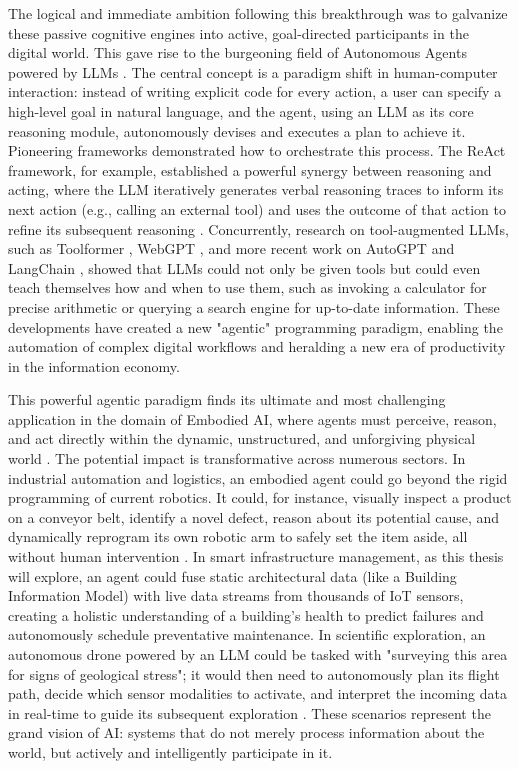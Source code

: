 The logical and immediate ambition following this breakthrough was to galvanize these passive cognitive engines into active, goal-directed participants in the digital world. This gave rise to the burgeoning field of Autonomous Agents powered by LLMs \cite{xi2023rise}. The central concept is a paradigm shift in human-computer interaction: instead of writing explicit code for every action, a user can specify a high-level goal in natural language, and the agent, using an LLM as its core reasoning module, autonomously devises and executes a plan to achieve it. Pioneering frameworks demonstrated how to orchestrate this process. The ReAct framework, for example, established a powerful synergy between reasoning and acting, where the LLM iteratively generates verbal reasoning traces to inform its next action (e.g., calling an external tool) and uses the outcome of that action to refine its subsequent reasoning \cite{yao2022react}. Concurrently, research on tool-augmented LLMs, such as Toolformer \cite{schick2023toolformer}, WebGPT \cite{nakano2021webgpt}, and more recent work on AutoGPT \cite{richards2023autogpt} and LangChain \cite{chase2022langchain}, showed that LLMs could not only be given tools but could even teach themselves how and when to use them, such as invoking a calculator for precise arithmetic or querying a search engine for up-to-date information. These developments have created a new "agentic" programming paradigm, enabling the automation of complex digital workflows and heralding a new era of productivity in the information economy.

This powerful agentic paradigm finds its ultimate and most challenging application in the domain of Embodied AI, where agents must perceive, reason, and act directly within the dynamic, unstructured, and unforgiving physical world \cite{duan2022survey}. The potential impact is transformative across numerous sectors. In industrial automation and logistics, an embodied agent could go beyond the rigid programming of current robotics. It could, for instance, visually inspect a product on a conveyor belt, identify a novel defect, reason about its potential cause, and dynamically reprogram its own robotic arm to safely set the item aside, all without human intervention \cite{ahn2022can, brohan2023rt2}. In smart infrastructure management, as this thesis will explore, an agent could fuse static architectural data (like a Building Information Model) with live data streams from thousands of IoT sensors, creating a holistic understanding of a building's health to predict failures and autonomously schedule preventative maintenance. In scientific exploration, an autonomous drone powered by an LLM could be tasked with "surveying this area for signs of geological stress"; it would then need to autonomously plan its flight path, decide which sensor modalities to activate, and interpret the incoming data in real-time to guide its subsequent exploration \cite{vemprala2023chatgpt, liu2023llm}. These scenarios represent the grand vision of AI: systems that do not merely process information about the world, but actively and intelligently participate in it.

